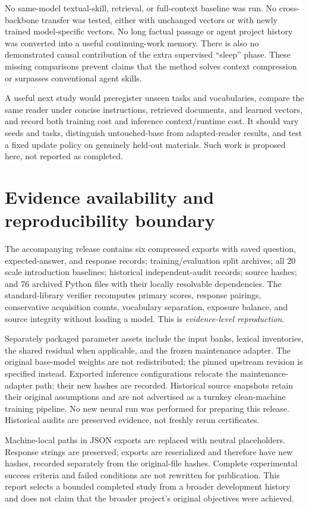 \documentclass[11pt]{article}
\begin{document}
No same-model textual-skill, retrieval, or full-context baseline was run. No cross-backbone transfer was tested, either with unchanged vectors or with newly trained model-specific vectors. No long factual passage or agent project history was converted into a useful continuing-work memory. There is also no demonstrated causal contribution of the extra supervised ``sleep'' phase. These missing comparisons prevent claims that the method solves context compression or surpasses conventional agent skills.

A useful next study would preregister unseen tasks and vocabularies, compare the same reader under concise instructions, retrieved documents, and learned vectors, and record both training cost and inference context/runtime cost. It should vary seeds and tasks, distinguish untouched-base from adapted-reader results, and test a fixed update policy on genuinely held-out materials. Such work is proposed here, not reported as completed.

\section{Evidence availability and reproducibility boundary}
The accompanying release contains six compressed exports with saved question, expected-answer, and response records; training/evaluation split archives; all 20 scale introduction baselines; historical independent-audit records; source hashes; and 76 archived Python files with their locally resolvable dependencies. The standard-library verifier recomputes primary scores, response pairings, conservative acquisition counts, vocabulary separation, exposure balance, and source integrity without loading a model. This is \emph{evidence-level reproduction}.

Separately packaged parameter assets include the input banks, lexical inventories, the shared residual when applicable, and the frozen maintenance adapter. The original base-model weights are not redistributed; the pinned upstream revision is specified instead. Exported inference configurations relocate the maintenance-adapter path; their new hashes are recorded. Historical source snapshots retain their original assumptions and are not advertised as a turnkey clean-machine training pipeline. No new neural run was performed for preparing this release. Historical audits are preserved evidence, not freshly rerun certificates.

Machine-local paths in JSON exports are replaced with neutral placeholders. Response strings are preserved; exports are reserialized and therefore have new hashes, recorded separately from the original-file hashes. Complete experimental success criteria and failed conditions are not rewritten for publication. This report selects a bounded completed study from a broader development history and does not claim that the broader project's original objectives were achieved.
\end{document}
